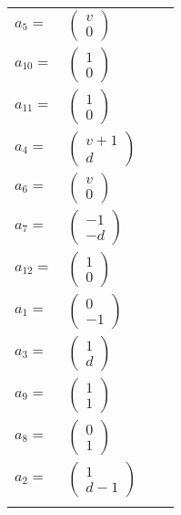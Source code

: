 \documentclass[1p]{elsarticle_modified}
\theoremstyle{definition}
\begin{document}
\begin{tabular}{m{7pt} m{180pt} m{7pt} m{180pt} }
\flushright $a_{5}=$&$\begin{pmatrix}v\\0\end{pmatrix}$ \\
\flushright $a_{10}=$&$\begin{pmatrix}1\\0\end{pmatrix}$ \\
\flushright $a_{11}=$&$\begin{pmatrix}1\\0\end{pmatrix}$ \\
\flushright $a_{4}=$&$\begin{pmatrix}v+1\\d\end{pmatrix}$ \\
\flushright $a_{6}=$&$\begin{pmatrix}v\\0\end{pmatrix}$ \\
\flushright $a_{7}=$&$\begin{pmatrix}-1\\- d\end{pmatrix}$ \\
\flushright $a_{12}=$&$\begin{pmatrix}1\\0\end{pmatrix}$ \\
\flushright $a_{1}=$&$\begin{pmatrix}0\\-1\end{pmatrix}$ \\
\flushright $a_{3}=$&$\begin{pmatrix}1\\d\end{pmatrix}$ \\
\flushright $a_{9}=$&$\begin{pmatrix}1\\1\end{pmatrix}$ \\
\flushright $a_{8}=$&$\begin{pmatrix}0\\1\end{pmatrix}$ \\
\flushright $a_{2}=$&$\begin{pmatrix}1\\d-1\end{pmatrix}$\\&\end{tabular}
\end{document}
